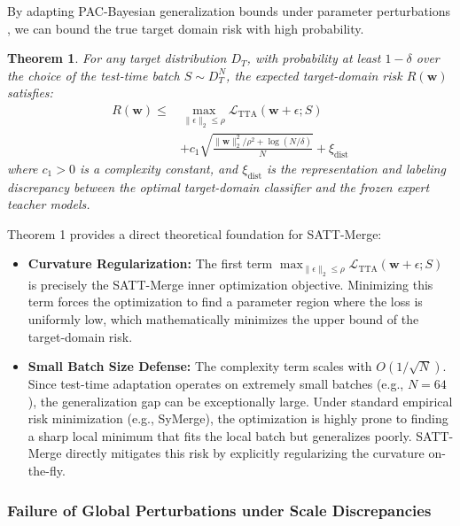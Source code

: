 \documentclass{article}
\begin{document}
By adapting PAC-Bayesian generalization bounds under parameter perturbations \cite{saim2026}, we can bound the true target domain risk with high probability.
\newtheorem{theorem}{Theorem}
\begin{theorem}
For any target distribution $D_T$, with probability at least $1 - \delta$ over the choice of the test-time batch $S \sim D_T^N$, the expected target-domain risk $R(\mathbf{w})$ satisfies:
\begin{equation}
\begin{aligned}
R(\mathbf{w}) \le & \max_{\|\epsilon\|_2 \le \rho} \mathcal{L}_{\text{TTA}}(\mathbf{w} + \epsilon; S) \\
& + c_1 \sqrt{\frac{\|\mathbf{w}\|_2^2 / \rho^2 + \log(N / \delta)}{N}} + \xi_{\text{dist}}
\end{aligned}
\label{eq:pac_bound}
\end{equation}
where $c_1 > 0$ is a complexity constant, and $\xi_{\text{dist}}$ is the representation and labeling discrepancy between the optimal target-domain classifier and the frozen expert teacher models.
\end{theorem}

Theorem 1 provides a direct theoretical foundation for SATT-Merge:
\begin{itemize}
    \item \textbf{Curvature Regularization:} The first term $\max_{\|\epsilon\|_2 \le \rho} \mathcal{L}_{\text{TTA}}(\mathbf{w} + \epsilon; S)$ is precisely the SATT-Merge inner optimization objective. Minimizing this term forces the optimization to find a parameter region where the loss is uniformly low, which mathematically minimizes the upper bound of the target-domain risk.
    \item \textbf{Small Batch Size Defense:} The complexity term scales with $O(1 / \sqrt{N})$. Since test-time adaptation operates on extremely small batches (e.g., $N=64$), the generalization gap can be exceptionally large. Under standard empirical risk minimization (e.g., SyMerge), the optimization is highly prone to finding a sharp local minimum that fits the local batch but generalizes poorly. SATT-Merge directly mitigates this risk by explicitly regularizing the curvature on-the-fly.
\end{itemize}

\subsubsection{Failure of Global Perturbations under Scale Discrepancies}
\end{document}
